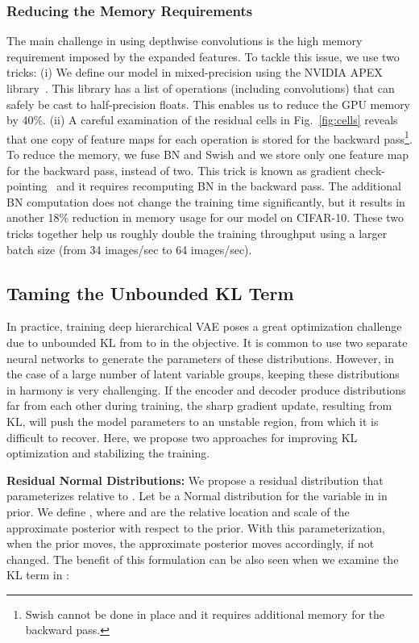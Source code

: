 \documentclass{article}
\begin{document}
\subsubsection{Reducing the Memory Requirements}
The main challenge in using depthwise convolutions is the high memory requirement imposed by the expanded features. To tackle this issue, we use two tricks: (i) We define our model in mixed-precision using the NVIDIA APEX library~\cite{apex}. This library has a list of operations (including convolutions) that can safely be cast to half-precision floats. This enables us to reduce the GPU memory by 40\%. (ii) A careful examination of the residual cells in Fig.~\ref{fig:cells} reveals that one copy of feature maps for each operation is stored for the backward pass\footnote{Swish cannot be done in place and it requires additional memory for the backward pass.}. To reduce the memory, we fuse BN and Swish and we store only one feature map for the backward pass, instead of two. This trick is known as gradient check-pointing~\cite{chen2016training, martens2012training} and it requires recomputing BN in the backward pass. The additional BN computation does not change the training time significantly, but it results in another 18\% reduction in memory usage for our model on CIFAR-10. These two tricks together help us roughly double the training throughput using a larger batch size (from 34 images/sec to 64 images/sec).


\subsection{Taming the Unbounded KL Term}\label{sec:nvae_kl}

In practice, training deep hierarchical VAE poses a great optimization challenge due to unbounded KL from  to  in the objective. It is common to use two separate neural networks to generate the parameters of these distributions. However, in the case of a large number of latent variable groups, keeping these distributions in harmony is very challenging. If the encoder and decoder produce distributions far from each other during training, the sharp gradient update, resulting from KL, will push the model parameters to an unstable region, from which it is difficult to recover. Here, we propose two approaches for improving KL optimization and stabilizing the training.


\textbf{Residual Normal Distributions:}
We propose a residual distribution that parameterizes  relative to . Let  be a Normal distribution for the  variable in  in prior. We define
,    
where  and  are the relative location and scale of the approximate posterior with respect to the prior. With this parameterization, when the prior moves, the approximate posterior moves accordingly, if not changed. The benefit of this formulation can be also seen when we examine the KL term in :
\end{document}
